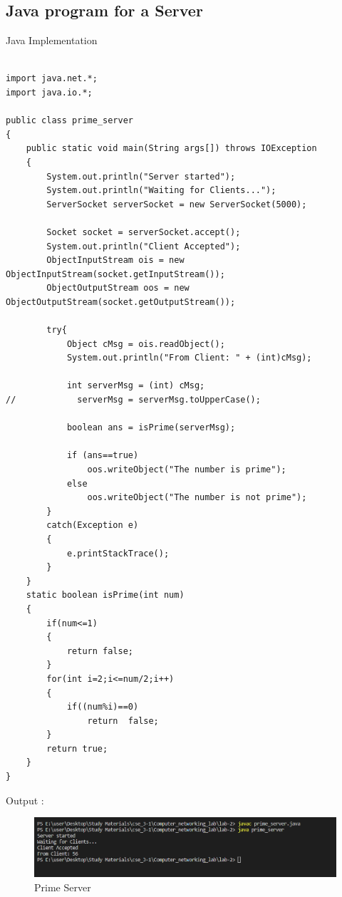\documentclass[11pt]{article}
\begin{document}
\subsection{Java program for a Server }
Java Implementation \\[2pt]
\begin{verbatim}

import java.net.*;
import java.io.*;

public class prime_server
{
    public static void main(String args[]) throws IOException
    {
        System.out.println("Server started");
        System.out.println("Waiting for Clients...");
        ServerSocket serverSocket = new ServerSocket(5000);

        Socket socket = serverSocket.accept();
        System.out.println("Client Accepted");
        ObjectInputStream ois = new ObjectInputStream(socket.getInputStream());
        ObjectOutputStream oos = new ObjectOutputStream(socket.getOutputStream());

        try{
            Object cMsg = ois.readObject();
            System.out.println("From Client: " + (int)cMsg);

            int serverMsg = (int) cMsg;
//            serverMsg = serverMsg.toUpperCase();

            boolean ans = isPrime(serverMsg);

            if (ans==true)
                oos.writeObject("The number is prime");
            else
                oos.writeObject("The number is not prime");
        }
        catch(Exception e)
        {
            e.printStackTrace();
        }
    }
    static boolean isPrime(int num)
    {
        if(num<=1)
        {
            return false;
        }
        for(int i=2;i<=num/2;i++)
        {
            if((num%i)==0)
                return  false;
        }
        return true;
    }
}
\end{verbatim}
\pagebreak
 Output : 
\begin{figure}[!h]
\centering
\includegraphics[width=\textwidth]{prime_server.png}
\caption{Prime Server}
\end{figure}
\FloatBarrier
\end{document}
